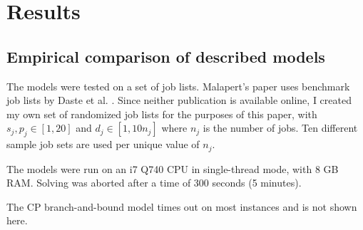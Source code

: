 \newpage
\chapter{Results}
\section{Empirical comparison of described models}
The models were tested on a set of job lists. Malapert's paper uses benchmark
job lists by Daste et al. \cite{daste1, daste2}. Since neither publication is
available online, I created my own set of randomized job lists for the purposes
of this paper, with $s_j, p_j \in [1, 20]$ and $d_j \in [1, 10n_j]$ where $n_j$ is
the number of jobs. Ten different sample job sets are used per unique value of
$n_j$.

The models were run on an i7 Q740 CPU in single-thread mode, with 8 GB RAM.
Solving was aborted after a time of 300 seconds (5 minutes).

The CP branch-and-bound model times out on most instances and is not shown here.



